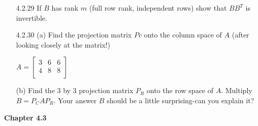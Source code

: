 \documentclass[10pt,twoside,reqno]{article}
\begin{document}
\begin{enumerate}
\vspace{3mm}
\item[4.2.29] If $B$ has rank $m$ (full row rank, independent rows) show that $BB^T$ is invertible. 
\vspace{3mm}

\vspace{3mm}
\item[4.2.30] (a) Find the projection matrix $Pc$ onto the column space of $A$ (after looking closely at the matrix!) \\
\begin{center}
$
A=
\begin{bmatrix}
3&6&6\\
4&8&8\\
\end{bmatrix}
$
\end{center}
 (b) Find the 3 by 3 projection matrix $P_R$ onto the row space of $A$. Multiply $B = P_CAP_R$. Your answer $B$ should be a little surprising-can you explain it?  \\
\vspace{3mm}

\vspace{3mm}

\end{enumerate}
\vspace{5mm}
\textbf{Chapter 4.3}
\end{document}
